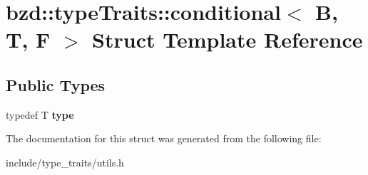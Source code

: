 \hypertarget{structbzd_1_1typeTraits_1_1conditional}{}\section{bzd\+:\+:type\+Traits\+:\+:conditional$<$ B, T, F $>$ Struct Template Reference}
\label{structbzd_1_1typeTraits_1_1conditional}
\subsection*{Public Types}
\begin{DoxyCompactItemize}
\item 
\mbox{\label{structbzd_1_1typeTraits_1_1conditional_a51ec32484305df50cee944598eefb508}} 
typedef T {\bfseries type}
\end{DoxyCompactItemize}


The documentation for this struct was generated from the following file\+:\begin{DoxyCompactItemize}
\item 
include/type\+\_\+traits/utils.\+h\end{DoxyCompactItemize}
